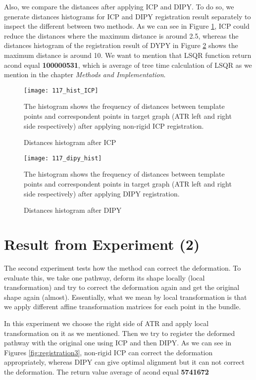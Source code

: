 \documentclass[../structure.tex]{subfiles}
\begin{document}
Also, we compare the distances after applying ICP and DIPY. To do so, we generate distances histograms for ICP and DIPY registration result separately to inspect the different between two methods. As we can see in Figure \ref{fig:hist_ICP}, ICP could reduce the distances where the maximum distance is around 2.5, whereas the distances histogram of the registration result of DYPY in Figure \ref{fig:hist_dipy} shows the maximum distance is around 10. We want to mention that LSQR function return acond equal \textbf{100000531}, which is average of tree time calculation of LSQR as we mention in the chapter \textit{Methods and Implementation}.

\begin{figure}[H]
\centering
\texttt{[image: 117\_hist\_ICP]}
\captionsetup{justification=centering}
\caption{Distances histogram after ICP}%
{The histogram shows the frequency of distances between template points and correspondent points in target graph (ATR left and right side respectively) after applying non-rigid ICP registration.}
\label{fig:hist_ICP}
\end{figure}

\begin{figure}[H]
\centering
\texttt{[image: 117\_dipy\_hist]}
\captionsetup{justification=centering}
\caption{Distances histogram after DIPY}%
{The histogram shows the frequency of distances between template points and correspondent points in target graph (ATR left and right side respectively) after applying DIPY registration.}
\label{fig:hist_dipy}
\end{figure}

\section{Result from Experiment (2)}
The second experiment tests how the method can correct the deformation. To evaluate this, we take one pathway, deform its shape locally (local transformation) and try to correct the deformation again and get the original shape again (almost). Essentially, what we mean by local transformation is that we apply different affine transformation matrices for each point in the bundle. 

In this experiment we choose the right side of ATR and apply local transformation on it as we mentioned. Then we try to register the deformed pathway with the original one using ICP and then DIPY. As we can see in Figures \ref{fig:registration3}, non-rigid ICP can correct the deformation appropriately, whereas DIPY can give optimal alignment but it can not correct the deformation. The return value average of acond equal \textbf{5741672}
\end{document}
